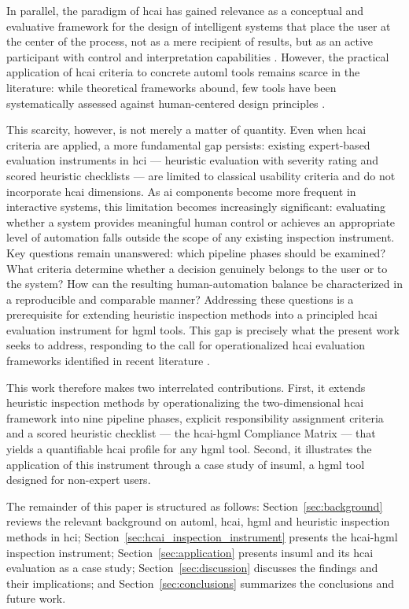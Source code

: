 \documentclass[a4paper,twoside]{article}
\begin{document}
In parallel, the paradigm of \gls{hcai} has gained relevance as a conceptual 
and evaluative framework for the design of intelligent systems that place the 
user at the center of the process, not as a mere recipient of results, but as 
an active participant with control and interpretation capabilities 
\cite{shneiderman2022human}. However, the practical application of \gls{hcai} 
criteria to concrete \gls{automl} tools remains scarce in the literature: 
while theoretical frameworks abound, few tools have been systematically 
assessed against human-centered design principles \cite{capel2023human}.

This scarcity, however, is not merely a matter of quantity. Even when 
\gls{hcai} criteria are applied, a more fundamental gap persists: existing expert-based evaluation instruments in \gls{hci} --- heuristic 
evaluation with severity rating and scored heuristic checklists --- are 
limited to classical usability criteria \cite{nielsen1994usability} and do not incorporate \gls{hcai} 
dimensions. As \gls{ai} components become more frequent in interactive systems, this limitation becomes increasingly 
significant: evaluating whether a system provides meaningful human 
control or achieves an appropriate level of automation falls outside the 
scope of any existing inspection instrument. Key questions remain 
unanswered: which pipeline phases should be examined? What criteria 
determine whether a decision genuinely belongs to the user or to the 
system? How can the resulting human-automation balance be characterized 
in a reproducible and comparable manner? Addressing these questions is a 
prerequisite for extending heuristic inspection methods into a principled 
\gls{hcai} evaluation instrument for \gls{hgml} tools. This gap is 
precisely what the present work seeks to address, responding to the call 
for operationalized \gls{hcai} evaluation frameworks identified in recent 
literature \cite{xu2026hcai}.

This work therefore makes two interrelated contributions. First, it 
extends heuristic inspection methods by operationalizing the 
two-dimensional \gls{hcai} framework into nine pipeline phases, explicit 
responsibility assignment criteria and a scored heuristic checklist --- 
the \gls{hcai}-\gls{hgml} Compliance Matrix --- that yields a 
quantifiable \gls{hcai} profile for any \gls{hgml} tool. Second, it 
illustrates the application of this instrument through a case study of 
\gls{insuml}, a \gls{hgml} tool designed for non-expert users.

The remainder of this paper is structured as follows: 
Section~\ref{sec:background} reviews the relevant background on 
\gls{automl}, \gls{hcai}, \gls{hgml} and heuristic inspection methods 
in \gls{hci}; Section~\ref{sec:hcai_inspection_instrument} presents the \gls{hcai}-\gls{hgml} 
inspection instrument; Section~\ref{sec:application} presents \gls{insuml} 
and its \gls{hcai} evaluation as a case study; Section~\ref{sec:discussion} 
discusses the findings and their implications; and Section~\ref{sec:conclusions} 
summarizes the conclusions and future work.
\end{document}
